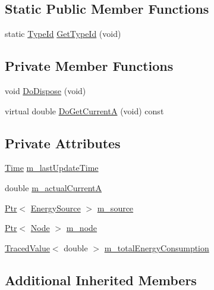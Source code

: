 \subsection*{Static Public Member Functions}
\begin{DoxyCompactItemize}
\item 
static \hyperlink{classns3_1_1TypeId}{Type\+Id} \hyperlink{classns3_1_1SimpleDeviceEnergyModel_a7c04d53de802969ae710f6d8bebab459}{Get\+Type\+Id} (void)
\end{DoxyCompactItemize}
\subsection*{Private Member Functions}
\begin{DoxyCompactItemize}
\item 
void \hyperlink{classns3_1_1SimpleDeviceEnergyModel_a9ca49716d532047396896516209881e3}{Do\+Dispose} (void)
\item 
virtual double \hyperlink{classns3_1_1SimpleDeviceEnergyModel_aefb22f990715c4cbadedf12c9039c70c}{Do\+Get\+CurrentA} (void) const 
\end{DoxyCompactItemize}
\subsection*{Private Attributes}
\begin{DoxyCompactItemize}
\item 
\hyperlink{classns3_1_1Time}{Time} \hyperlink{classns3_1_1SimpleDeviceEnergyModel_ac2468ddcb4408665a2daab720ad0a911}{m\+\_\+last\+Update\+Time}
\item 
double \hyperlink{classns3_1_1SimpleDeviceEnergyModel_ae7ba1e8973d4eafe317298feaa5e39fe}{m\+\_\+actual\+CurrentA}
\item 
\hyperlink{classns3_1_1Ptr}{Ptr}$<$ \hyperlink{classns3_1_1EnergySource}{Energy\+Source} $>$ \hyperlink{classns3_1_1SimpleDeviceEnergyModel_af957a6ef8ed0a7bde46045a501c4a587}{m\+\_\+source}
\item 
\hyperlink{classns3_1_1Ptr}{Ptr}$<$ \hyperlink{classns3_1_1Node}{Node} $>$ \hyperlink{classns3_1_1SimpleDeviceEnergyModel_a1c679f02e522d0c7f576986196ceb610}{m\+\_\+node}
\item 
\hyperlink{classns3_1_1TracedValue}{Traced\+Value}$<$ double $>$ \hyperlink{classns3_1_1SimpleDeviceEnergyModel_a55d76bff70f464f11d37e99d8f7ce4b9}{m\+\_\+total\+Energy\+Consumption}
\end{DoxyCompactItemize}
\subsection*{Additional Inherited Members}



